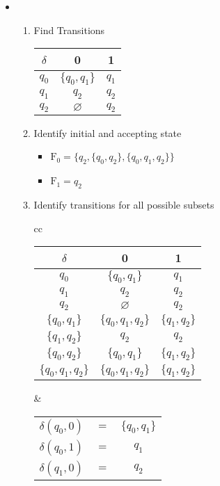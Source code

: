 \documentclass{article}
\def \answer{\item [$\rightarrow$]}
\newlength{\ansindent}
\begin{document}
\begin{itemize}
	\answer
		\begin{enumerate}[label=Step \arabic* :,itemindent=\ansindent]
			\item Find Transitions
				\begin{table}[H]
					\centering
					\begin{tabular}{c|c|c}
						$\delta$ & 0             & 1     \\ \hline
						$q_0$    & $\{q_0,q_1\}$ & $q_1$ \\
						$q_1$    & $q_2$         & $q_2$ \\
						$q_2$    & $\varnothing$ & $q_2$
					\end{tabular}
				\end{table}
			\item Identify initial and accepting state
				\begin{itemize}[label=,leftmargin=1.5em]
					\item $\text{F}_0=\{q_2,\{q_0,q_2\},\{q_0,q_1,q_2\}\}$
					\item $\text{F}_1=q_2$
				\end{itemize}
			\item Identify transitions for all possible subsets
				\begin{table}[H]
					\centering
					\begin{tabular}{cc}
						\begin{tabular}{c|c|c}
							$\delta$          & 0                 & 1             \\ \hline
							$q_0$             & $\{q_0,q_1\}$     & $q_1$         \\
							$q_1$             & $q_2$             & $q_2$         \\
							$q_2$             & $\varnothing$     & $q_2$         \\
							$\{q_0,q_1\}$     & $\{q_0,q_1,q_2\}$ & $\{q_1,q_2\}$ \\
							$\{q_1,q_2\}$     & $q_2$             & $q_2$         \\
							$\{q_0,q_2\}$     & $\{q_0,q_1\}$     & $\{q_1,q_2\}$ \\
							$\{q_0,q_1,q_2\}$ & $\{q_0,q_1,q_2\}$ & $\{q_1,q_2\}$
						\end{tabular} &
						\begin{tabular}{ccc}
							$\delta(q_0,0)$             & $=$ & $\{q_0,q_1\}$     \\
							$\delta(q_0,1)$             & $=$ & $q_1$             \\
							$\delta(q_1,0)$             & $=$ & $q_2$             \\

\end{tabular}
\end{tabular}
\end{table}
\end{enumerate}
\end{itemize}
\end{document}
